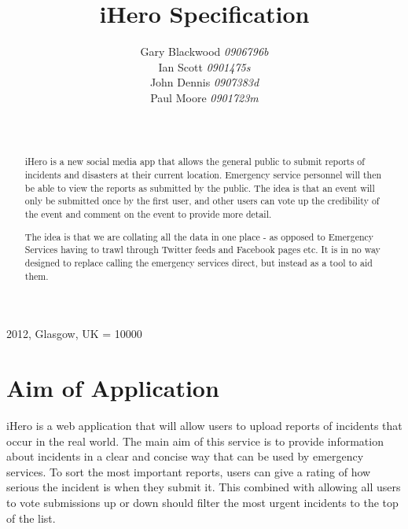 \documentclass{sig-alt-release2}
\begin{document}
\newcommand{\todo}[1]{\textcolor{red}{#1}}
\def\newblock{\hskip .11em plus .33em minus .07em}

 {2012, Glasgow, UK} 
\widowpenalty = 10000

\title{{iHero Specification}}

\author{
\alignauthor 
Gary Blackwood \textit{0906796b}\\
Ian Scott \textit{0901475s}\\
John Dennis \textit{0907383d}\\
Paul Moore \textit{0901723m}\\
\\
\\
}
\maketitle

\begin{abstract}
iHero is a new social media app that allows the general public to submit reports of incidents and disasters at their current location. Emergency service personnel will then be able to view the reports as submitted by the public. The idea is that an event will only be submitted once by the first user, and other users can vote up the credibility of the event and comment on the event to provide more detail.

The idea is that we are collating all the data in one place - as opposed to Emergency Services having to trawl through Twitter feeds and Facebook pages etc. It is in no way designed to replace calling the emergency services direct, but instead as a tool to aid them.
\end{abstract}

\section{Aim of Application}
iHero is a web application that will allow users to upload reports of incidents that occur in the real world. The main aim of this service is to provide information about incidents in a clear and concise way that can be used by emergency services. To sort the most important reports, users can give a rating of how serious the incident is when they submit it. This combined with allowing all users to vote submissions up or down should filter the most urgent incidents to the top of the list.
\end{document}
